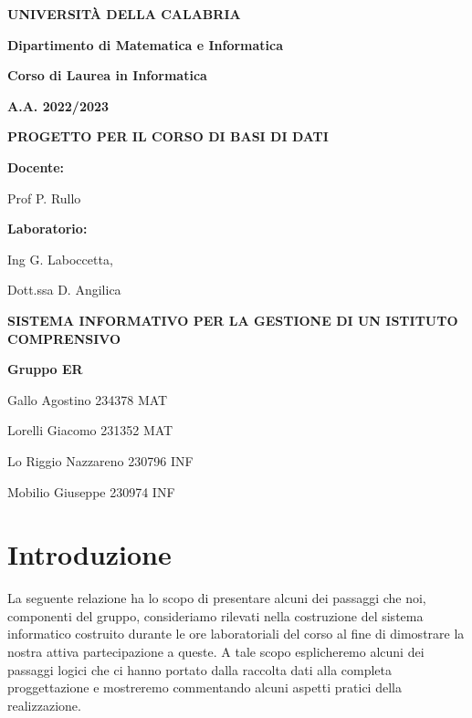 \documentclass{article}
\begin{document}
\begin{titlepage}
    \centering
    \vskip 60pt
    \textbf{UNIVERSITÀ DELLA CALABRIA}
    
    \textbf{Dipartimento di Matematica e Informatica}
    
    \textbf{Corso di Laurea in Informatica}

    \textbf{A.A. 2022/2023}
    
    \vspace{1.5cm}
    
    \textbf{PROGETTO PER IL CORSO DI BASI DI DATI}
    
    \vspace{2.8cm}
    
    \textbf{Docente:}
    
     Prof P. Rullo

    \vspace{0.5 cm}
    
    \textbf{Laboratorio:}

    Ing G. Laboccetta, 
    
    Dott.ssa D. Angilica
    
    \vspace{2.8cm}
    \textbf{SISTEMA INFORMATIVO PER LA GESTIONE DI UN ISTITUTO COMPRENSIVO}

    \vspace{4.5 cm}
    \textbf{Gruppo ER}

    Gallo Agostino 234378 MAT
    
    Lorelli Giacomo 231352 MAT
    
    Lo Riggio Nazzareno 230796 INF
    
    Mobilio Giuseppe 230974 INF

    

\end{titlepage}

\section{Introduzione}
La seguente relazione ha lo scopo di presentare alcuni dei passaggi che noi, componenti del gruppo, consideriamo rilevati nella costruzione del sistema informatico costruito durante le ore laboratoriali del corso al fine di dimostrare la nostra attiva partecipazione a queste. A tale scopo esplicheremo alcuni dei passaggi logici che ci hanno portato dalla raccolta dati alla completa proggettazione e mostreremo commentando alcuni aspetti pratici della realizzazione.
\end{document}
